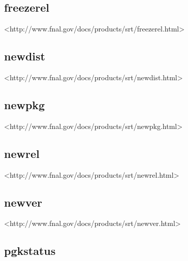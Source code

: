 \subsection{freezerel}
\label{com_freezerel}

<http://www.fnal.gov/docs/products/srt/freezerel.html>



\subsection{newdist}
\label{com_newdist}

<http://www.fnal.gov/docs/products/srt/newdist.html>


\subsection{newpkg}
\label{com_newpkg}

<http://www.fnal.gov/docs/products/srt/newpkg.html>


\subsection{newrel}
\label{com_newrel}

<http://www.fnal.gov/docs/products/srt/newrel.html>


\subsection{newver}
\label{com_newver}

<http://www.fnal.gov/docs/products/srt/newver.html>


\subsection{pgkstatus}
\label{com_pgkstatus}

